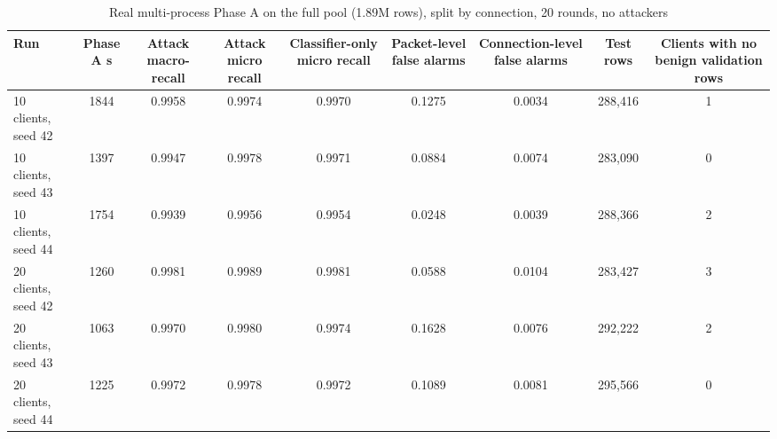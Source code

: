 \begin{table}[H]
\centering
\scriptsize
\setlength{\tabcolsep}{3pt}
\renewcommand{\arraystretch}{1.15}
\begin{tabular}{|l|c|c|c|c|c|c|c|c|}
\hline
\textbf{Run} & \textbf{Phase A s} & \textbf{Attack macro-recall} & \textbf{Attack micro recall} & \textbf{Classifier-only micro recall} & \textbf{Packet-level false alarms} & \textbf{Connection-level false alarms} & \textbf{Test rows} & \textbf{Clients with no benign validation rows} \\ \hline
10 clients, seed 42 & 1844 & 0.9958 & 0.9974 & 0.9970 & 0.1275 & 0.0034 & 288,416 & 1 \\ \hline
10 clients, seed 43 & 1397 & 0.9947 & 0.9978 & 0.9971 & 0.0884 & 0.0074 & 283,090 & 0 \\ \hline
10 clients, seed 44 & 1754 & 0.9939 & 0.9956 & 0.9954 & 0.0248 & 0.0039 & 288,366 & 2 \\ \hline
20 clients, seed 42 & 1260 & 0.9981 & 0.9989 & 0.9981 & 0.0588 & 0.0104 & 283,427 & 3 \\ \hline
20 clients, seed 43 & 1063 & 0.9970 & 0.9980 & 0.9974 & 0.1628 & 0.0076 & 292,222 & 2 \\ \hline
20 clients, seed 44 & 1225 & 0.9972 & 0.9978 & 0.9972 & 0.1089 & 0.0081 & 295,566 & 0 \\ \hline
\end{tabular}
\caption{Real multi-process Phase A on the full pool (1.89M rows), split by connection, 20 rounds, no attackers}
\label{tab:full_real_full}
\end{table}
